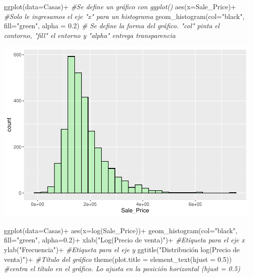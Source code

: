 \documentclass[
]{article}
\newenvironment{Shaded}{\begin{snugshade}}{\end{snugshade}}
\newcommand{\AttributeTok}[1]{\textcolor[rgb]{0.77,0.63,0.00}{#1}}
\newcommand{\CommentTok}[1]{\textcolor[rgb]{0.56,0.35,0.01}{\textit{#1}}}
\newcommand{\FloatTok}[1]{\textcolor[rgb]{0.00,0.00,0.81}{#1}}
\newcommand{\FunctionTok}[1]{\textcolor[rgb]{0.00,0.00,0.00}{#1}}
\newcommand{\NormalTok}[1]{#1}
\newcommand{\SpecialCharTok}[1]{\textcolor[rgb]{0.00,0.00,0.00}{#1}}
\newcommand{\StringTok}[1]{\textcolor[rgb]{0.31,0.60,0.02}{#1}}
\begin{document}
\begin{Shaded}
\begin{Highlighting}[]
\FunctionTok{ggplot}\NormalTok{(}\AttributeTok{data=}\NormalTok{Casas)}\SpecialCharTok{+} \CommentTok{\#Se define un gráfico con ggplot()}
  \FunctionTok{aes}\NormalTok{(}\AttributeTok{x=}\NormalTok{Sale\_Price)}\SpecialCharTok{+} \CommentTok{\#Solo le ingresamos el eje "x" para un histograma}
  \FunctionTok{geom\_histogram}\NormalTok{(}\AttributeTok{col=}\StringTok{"black"}\NormalTok{, }\AttributeTok{fill=}\StringTok{"green"}\NormalTok{, }\AttributeTok{alpha =} \FloatTok{0.2}\NormalTok{) }\CommentTok{\# Se define la forma del gráfico. "col" pinta el contorno, "fill" el entorno y "alpha" entrega transparencia }
\end{Highlighting}
\end{Shaded}

\includegraphics{LAB02_files/figure-latex/histograma-1.pdf}

\begin{Shaded}
\begin{Highlighting}[]
\FunctionTok{ggplot}\NormalTok{(}\AttributeTok{data=}\NormalTok{Casas)}\SpecialCharTok{+}
  \FunctionTok{aes}\NormalTok{(}\AttributeTok{x=}\FunctionTok{log}\NormalTok{(Sale\_Price))}\SpecialCharTok{+}
  \FunctionTok{geom\_histogram}\NormalTok{(}\AttributeTok{col=}\StringTok{"black"}\NormalTok{, }\AttributeTok{fill=}\StringTok{"green"}\NormalTok{, }\AttributeTok{alpha=}\FloatTok{0.2}\NormalTok{)}\SpecialCharTok{+}
  \FunctionTok{xlab}\NormalTok{(}\StringTok{"Log(Precio de venta)"}\NormalTok{)}\SpecialCharTok{+} \CommentTok{\#Etiqueta para el eje x}
  \FunctionTok{ylab}\NormalTok{(}\StringTok{"Frecuencia"}\NormalTok{)}\SpecialCharTok{+} \CommentTok{\#Etiqueta para el eje y}
  \FunctionTok{ggtitle}\NormalTok{(}\StringTok{"Distribución log(Precio de venta)"}\NormalTok{)}\SpecialCharTok{+} \CommentTok{\#Título del gráfico}
  \FunctionTok{theme}\NormalTok{(}\AttributeTok{plot.title =} \FunctionTok{element\_text}\NormalTok{(}\AttributeTok{hjust =} \FloatTok{0.5}\NormalTok{)) }\CommentTok{\#centra el título en el gráfico. Lo ajusta en la posición horizontal (hjust = 0.5)}
\end{Highlighting}
\end{Shaded}
\end{document}

